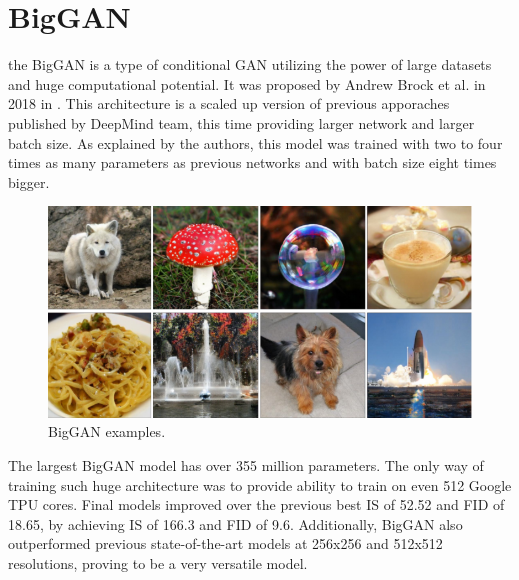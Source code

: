 \documentclass[12pt,a4paper,openany]{book}
\begin{document}



\section{BigGAN}

the BigGAN is a type of conditional GAN utilizing the power of large datasets and huge computational potential. It was proposed by Andrew Brock et al. in 2018 in \cite{biggan}. This architecture is a scaled up version of previous apporaches published by DeepMind team, this time providing larger network and larger batch size. As explained by the authors, this model was trained with two to four times as many parameters as previous networks and with batch size eight times bigger. 

\begin{figure}[H]
    \centering
    \includegraphics[scale=0.7]{figs/biggan_sample.png}
    \caption{BigGAN examples.}\label{Fig:biggan_sample}
\end{figure}

The largest BigGAN model has over 355 million parameters. The only way of training such huge architecture was to provide ability to train on even 512 Google TPU cores. Final models improved over the previous best IS of 52.52 and FID of 18.65, by achieving IS of 166.3 and FID of 9.6. Additionally, BigGAN also outperformed previous state-of-the-art models at 256x256 and 512x512 resolutions, proving to be a very versatile model.
\end{document}
